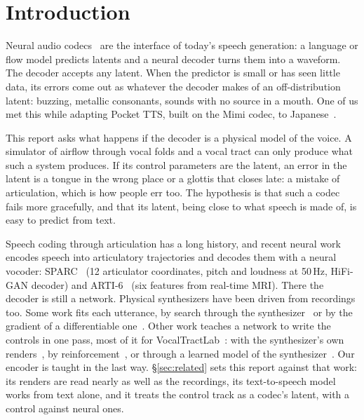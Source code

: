 \documentclass[10pt,a4paper,twocolumn]{article}
\begin{document}
\section{Introduction}
Neural audio codecs~\cite{encodec,moshi} are the interface of today's speech generation: a language
or flow model predicts latents and a neural decoder turns them into a waveform. The decoder
accepts any latent. When the predictor is small or has seen little data, its errors come out as
whatever the decoder makes of an off-distribution latent: buzzing, metallic consonants, sounds
with no source in a mouth. One of us met this while adapting Pocket TTS, built on the Mimi codec,
to Japanese~\cite{pocketja}.

This report asks what happens if the decoder is a physical model of the voice. A simulator of
airflow through vocal folds and a vocal tract can only produce what such a system produces. If
its control parameters are the latent, an error in the latent is a tongue in the wrong place or a
glottis that closes late: a mistake of articulation, which is how people err too. The hypothesis
is that such a codec fails more gracefully, and that its latent, being close to what speech is
made of, is easy to predict from text.

Speech coding through articulation has a long history, and recent neural work encodes speech into
articulatory trajectories and decodes them with a neural vocoder: SPARC~\cite{sparc} (12
articulator coordinates, pitch and loudness at 50\,Hz, HiFi-GAN decoder) and
ARTI-6~\cite{arti6} (six features from real-time MRI). There the decoder is still a network.
Physical synthesizers have been driven from recordings too. Some work fits each utterance, by
search through the synthesizer~\cite{promon} or by the gradient of a differentiable
one~\cite{sudholt,difftlm}. Other work teaches a network to write the controls in one pass,
most of it for VocalTractLab~\cite{vtl}: with the synthesizer's own
renders~\cite{gao,sun}, by reinforcement~\cite{shibata}, or through a learned model of the
synthesizer~\cite{krug}. Our encoder is taught in the last way.
\S\ref{sec:related} sets this report against that work: its renders are read nearly as well as
the recordings, its text-to-speech model works from text alone, and it treats the control track
as a codec's latent, with a control against neural ones.
\end{document}
